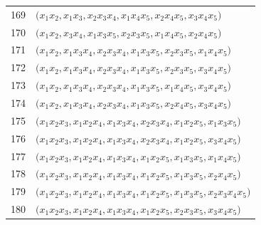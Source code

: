 {\begin{longtable}{@{}r>{\raggedright\arraybackslash}p{}@{}}
169 & \(\bigl(x_{1}x_{2},\allowbreak x_{1}x_{3},\allowbreak x_{2}x_{3}x_{4},\allowbreak x_{1}x_{4}x_{5},\allowbreak x_{2}x_{4}x_{5},\allowbreak x_{3}x_{4}x_{5}\bigr)\) \\
170 & \(\bigl(x_{1}x_{2},\allowbreak x_{3}x_{4},\allowbreak x_{1}x_{3}x_{5},\allowbreak x_{2}x_{3}x_{5},\allowbreak x_{1}x_{4}x_{5},\allowbreak x_{2}x_{4}x_{5}\bigr)\) \\
171 & \(\bigl(x_{1}x_{2},\allowbreak x_{1}x_{3}x_{4},\allowbreak x_{2}x_{3}x_{4},\allowbreak x_{1}x_{3}x_{5},\allowbreak x_{2}x_{3}x_{5},\allowbreak x_{1}x_{4}x_{5}\bigr)\) \\
172 & \(\bigl(x_{1}x_{2},\allowbreak x_{1}x_{3}x_{4},\allowbreak x_{2}x_{3}x_{4},\allowbreak x_{1}x_{3}x_{5},\allowbreak x_{2}x_{3}x_{5},\allowbreak x_{3}x_{4}x_{5}\bigr)\) \\
173 & \(\bigl(x_{1}x_{2},\allowbreak x_{1}x_{3}x_{4},\allowbreak x_{2}x_{3}x_{4},\allowbreak x_{1}x_{3}x_{5},\allowbreak x_{1}x_{4}x_{5},\allowbreak x_{3}x_{4}x_{5}\bigr)\) \\
174 & \(\bigl(x_{1}x_{2},\allowbreak x_{1}x_{3}x_{4},\allowbreak x_{2}x_{3}x_{4},\allowbreak x_{1}x_{3}x_{5},\allowbreak x_{2}x_{4}x_{5},\allowbreak x_{3}x_{4}x_{5}\bigr)\) \\
175 & \(\bigl(x_{1}x_{2}x_{3},\allowbreak x_{1}x_{2}x_{4},\allowbreak x_{1}x_{3}x_{4},\allowbreak x_{2}x_{3}x_{4},\allowbreak x_{1}x_{2}x_{5},\allowbreak x_{1}x_{3}x_{5}\bigr)\) \\
176 & \(\bigl(x_{1}x_{2}x_{3},\allowbreak x_{1}x_{2}x_{4},\allowbreak x_{1}x_{3}x_{4},\allowbreak x_{2}x_{3}x_{4},\allowbreak x_{1}x_{2}x_{5},\allowbreak x_{3}x_{4}x_{5}\bigr)\) \\
177 & \(\bigl(x_{1}x_{2}x_{3},\allowbreak x_{1}x_{2}x_{4},\allowbreak x_{1}x_{3}x_{4},\allowbreak x_{1}x_{2}x_{5},\allowbreak x_{1}x_{3}x_{5},\allowbreak x_{1}x_{4}x_{5}\bigr)\) \\
178 & \(\bigl(x_{1}x_{2}x_{3},\allowbreak x_{1}x_{2}x_{4},\allowbreak x_{1}x_{3}x_{4},\allowbreak x_{1}x_{2}x_{5},\allowbreak x_{1}x_{3}x_{5},\allowbreak x_{2}x_{4}x_{5}\bigr)\) \\
179 & \(\bigl(x_{1}x_{2}x_{3},\allowbreak x_{1}x_{2}x_{4},\allowbreak x_{1}x_{3}x_{4},\allowbreak x_{1}x_{2}x_{5},\allowbreak x_{1}x_{3}x_{5},\allowbreak x_{2}x_{3}x_{4}x_{5}\bigr)\) \\
180 & \(\bigl(x_{1}x_{2}x_{3},\allowbreak x_{1}x_{2}x_{4},\allowbreak x_{1}x_{3}x_{4},\allowbreak x_{1}x_{2}x_{5},\allowbreak x_{2}x_{3}x_{5},\allowbreak x_{3}x_{4}x_{5}\bigr)\) \\

\end{longtable}}
